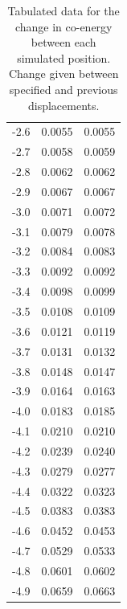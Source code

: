\documentclass[a4paper]{IEEEtran}
\begin{document}
\begin{table}[ht]
\begin{tabular}{@{}ccc@{}}
            -2.6                  & 0.0055 & 0.0055 \\
            -2.7                  & 0.0058 & 0.0059 \\
            -2.8                  & 0.0062 & 0.0062 \\
            -2.9                  & 0.0067 & 0.0067 \\
            -3.0                  & 0.0071 & 0.0072 \\
            -3.1                  & 0.0079 & 0.0078 \\
            -3.2                  & 0.0084 & 0.0083 \\
            -3.3                  & 0.0092 & 0.0092 \\
            -3.4                  & 0.0098 & 0.0099 \\
            -3.5                  & 0.0108 & 0.0109 \\
            -3.6                  & 0.0121 & 0.0119 \\
            -3.7                  & 0.0131 & 0.0132 \\
            -3.8                  & 0.0148 & 0.0147 \\
            -3.9                  & 0.0164 & 0.0163 \\
            -4.0                  & 0.0183 & 0.0185 \\
            -4.1                  & 0.0210 & 0.0210 \\
            -4.2                  & 0.0239 & 0.0240 \\
            -4.3                  & 0.0279 & 0.0277 \\
            -4.4                  & 0.0322 & 0.0323 \\
            -4.5                  & 0.0383 & 0.0383 \\
            -4.6                  & 0.0452 & 0.0453 \\
            -4.7                  & 0.0529 & 0.0533 \\
            -4.8                  & 0.0601 & 0.0602 \\
            -4.9                  & 0.0659 & 0.0663 \\ \bottomrule   
        \end{tabular}
        \caption{Tabulated data for the change in co-energy between each simulated position. Change given between specified and previous displacements.}
        \label{coenergy}
    \end{table}
\end{document}
